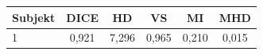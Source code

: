 \begin{tabular}{l c c c c c}
 \hline
Subjekt & DICE & HD & VS & MI & MHD \\ \hline
1 & 0,921 & 7,296 & 0,965 & 0,210 & 0,015 \\
\hline 
 \end{tabular}
